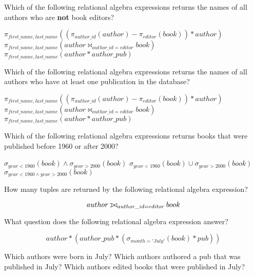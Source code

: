 \documentclass[answers,10pt,a4paper]{exam}
\def\ojoin{\setbox0=\hbox{$\bowtie$}%
  \rule[-.02ex]{.25em}{.4pt}\llap{\rule[\ht0]{.25em}{.4pt}}}
\def\leftouterjoin{\mathbin{\ojoin\mkern-5.8mu\bowtie}}
\begin{document}
\begin{questions}
\question[4] Which of the following relational algebra expressions returns the names of all authors who are {\bf not} book editors?

\begin{choices}
\correctchoice $\pi_{first\_name, last\_name}((\pi_{author\_id}(author)  -  \pi_{editor}(book)) * author)$
\choice $\pi_{first\_name, last\_name}(author \bowtie_{author\_id = editor} book)$
\choice $\pi_{first\_name, last\_name}(author * author\_pub)$
\end{choices}


\question[4] Which of the following relational algebra expressions returns the names of all authors who have at least one publication in the database?

\begin{choices}
\choice $\pi_{first\_name, last\_name}((\pi_{author\_id}(author)  -  \pi_{editor}(book)) * author)$
\choice $\pi_{first\_name, last\_name}(author \bowtie_{author\_id = editor} book)$
\correctchoice $\pi_{first\_name, last\_name}(author * author\_pub)$
\end{choices}


\question[4] Which of the following relational algebra expressions returns books that were published before 1960 or after 2000?

\begin{choices}
\choice $\sigma_{year < 1960}(book) \land \sigma_{year > 2000}(book)$
\correctchoice $\sigma_{year < 1960}(book) \cup \sigma_{year > 2000}(book)$
\choice $\sigma_{year < 1960 \land year > 2000}(book)$
\end{choices}

\question[4] How many tuples are returned by the following relational algebra expression?

\[
author \leftouterjoin_{author\_id = editor} book
\]

\begin{choices}
\end{choices}

\question[4] What question does the following relational algebra expression answer?

\[
author * (author\_pub * (\sigma_{month = 'July'}(book) * pub))
\]

\begin{choices}
\choice Which authors were born in July?
\correctchoice Which authors authored a pub that was published in July?
\choice Which authors edited books that were published in July?
\end{choices}


\end{questions}
\end{document}
